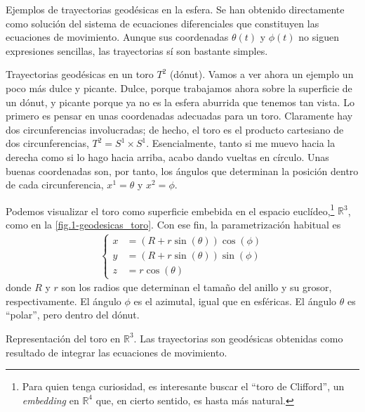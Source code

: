 \begin{example}
    \begin{figbox}
        {Ejemplos de trayectorias geodésicas en la esfera. Se han obtenido directamente como solución del sistema de ecuaciones diferenciales que constituyen las ecuaciones de movimiento. Aunque sus coordenadas \(\theta(t)\) y \(\phi(t)\) no siguen expresiones sencillas, las trayectorias sí son bastante simples.
        \label{fig.1-geodesicas_esfera}}
        
    \end{figbox}

    
\end{example}

\begin{example}
    {Trayectorias geodésicas en un toro \(T^2\) (dónut).}
    Vamos a ver ahora un ejemplo un poco más dulce y picante. Dulce, porque trabajamos ahora sobre la superficie de un dónut, y picante porque ya no es la esfera aburrida que tenemos tan vista. Lo primero es pensar en unas coordenadas adecuadas para un toro. Claramente hay dos circunferencias involucradas; de hecho, el toro es el producto cartesiano de dos circunferencias, \(T^2 = S^1\times S^1\). Esencialmente, tanto si me muevo hacia la derecha como si lo hago hacia arriba, acabo dando vueltas en círculo. Unas buenas coordenadas son, por tanto, los ángulos que determinan la posición dentro de cada circunferencia, \(x^1 = \theta\) y \(x^2 = \phi\).
    
    Podemos visualizar el toro como superficie embebida en el espacio euclídeo,\footnote{Para quien tenga curiosidad, es interesante buscar el ``toro de Clifford'', un \textit{embedding} en \(\mathbb{R}^4\) que, en cierto sentido, es hasta más natural.} \(\mathbb{R}^3\), como en la \cref{fig.1-geodesicas_toro}. Con ese fin, la parametrización habitual es
    \begin{align}
        \left\{\begin{aligned}
            x &= (R + r\sin(\theta))\cos(\phi)\\
            y &= (R + r\sin(\theta))\sin(\phi)\\
            z &= r\cos(\theta)
        \end{aligned}\right.
    \end{align}
    donde \(R\) y \(r\) son los radios que determinan el tamaño del anillo y su grosor, respectivamente. El ángulo \(\phi\) es el azimutal, igual que en esféricas. El ángulo \(\theta\) es ``polar'', pero dentro del dónut.
    
    \begin{figbox}
        {Representación del toro en \(\mathbb{R}^3\). Las trayectorias son geodésicas obtenidas como resultado de integrar las ecuaciones de movimiento.
        \label{fig.1-geodesicas_toro}}
        
    \end{figbox}


\end{example}
